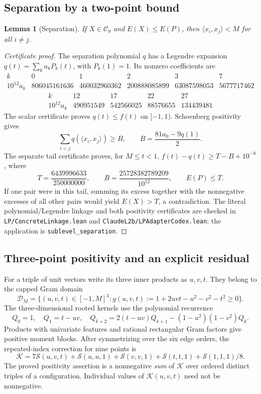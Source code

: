 \documentclass[11pt]{article}
\newtheorem{lemma}[theorem]{Lemma}
\theoremstyle{remark}
\newcommand{\ip}[2]{\langle #1,#2\rangle}
\newcommand{\code}[1]{{\small\nolinkurl{#1}}}
\newcommand{\pathcode}[1]{\nolinkurl{#1}}
\begin{document}
\subsection{Separation by a two-point bound}
\begin{lemma}[Separation]\label{lem:separation}
If $X\in\mathcal C_9$ and $E(X)\le E(P)$, then
$\ip{x_i}{x_j}<M$ for all $i\ne j$.
\end{lemma}
\begin{proof}[Certificate proof]
The separation polynomial $q$ has a Legendre expansion
$q(t)=\sum_k a_k P_k(t)$, with $P_k(1)=1$. Its nonzero coefficients are
\[
\begin{array}{c|rrrrr}
k&0&1&2&3&7\\\hline
10^{12}a_k&806045161636&460032960362&200888085899&63087598053&5677717462
\end{array}
\]
\[
\begin{array}{c|rrrr}
k&12&17&22&27\\\hline
10^{12}a_k&490951549&542566025&88576655&134439481
\end{array}
\]
The scalar certificate proves $q(t)\le f(t)$ on $[-1,1)$.
Schoenberg positivity gives
\[
 \sum_{i<j}q(\ip{x_i}{x_j})\ge B,
 \qquad B=\frac{81a_0-9q(1)}2.
\]
The separate tail certificate proves, for $M\le t<1$,
$f(t)-q(t)\ge T-B+10^{-8}$, where
\[
 T=\frac{6439996633}{250000000},\qquad
 B=\frac{25728382789209}{10^{12}},\qquad E(P)\le T.
\]
If one pair were in this tail, summing its excess together with the
nonnegative excesses of all other pairs would yield $E(X)>T$, a contradiction.
The literal polynomial/Legendre linkage and both positivity certificates are
checked in \pathcode{LP/ConcreteLinkage.lean} and
\pathcode{ClaudeL2b/LPAdapterCodex.lean}; the application is
\code{sublevel_separation}.
\end{proof}

\subsection{Three-point positivity and an explicit residual}
For a triple of unit vectors write its three inner products as $u,v,t$.
They belong to the capped Gram domain
\[
 \mathcal D_M=\{(u,v,t)\in[-1,M]^3:
       g(u,v,t):=1+2uvt-u^2-v^2-t^2\ge0\}.
\]
The three-dimensional rooted kernels use the polynomial recurrence
\[
 Q_0=1,\quad Q_1=t-uv,\quad
 Q_{k+2}=2(t-uv)Q_{k+1}-(1-u^2)(1-v^2)Q_k.
\]
Products with univariate features and rational rectangular Gram factors give
positive moment blocks. After symmetrizing over the six edge orders, the
repeated-index correction for nine points is
\[
 \mathcal K=7\mathcal S(u,v,t)+\mathcal S(u,u,1)
       +\mathcal S(v,v,1)+\mathcal S(t,t,1)
       +\mathcal S(1,1,1)/8.
\]
The proved positivity assertion is a nonnegative \emph{sum} of $\mathcal K$
over ordered distinct triples of a configuration. Individual values of
$\mathcal K(u,v,t)$ need not be nonnegative.
\end{document}
